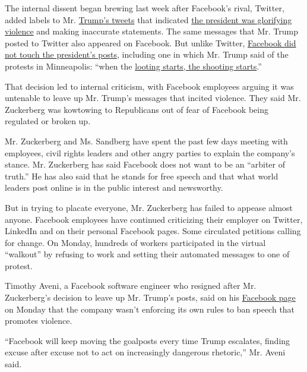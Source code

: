 The internal dissent began brewing last week after Facebook's rival,
Twitter, added labels to Mr.
\href{https://www.nytimes3xbfgragh.onion/2020/06/03/us/politics/trump-twitter-fact-check.html}{Trump's
tweets} that indicated
\href{https://www.nytimes3xbfgragh.onion/2020/05/29/technology/trump-twitter-minneapolis-george-floyd.html}{the
president was glorifying violence} and making inaccurate statements. The
same messages that Mr. Trump posted to Twitter also appeared on
Facebook. But unlike Twitter,
\href{https://www.nytimes3xbfgragh.onion/2020/05/29/technology/twitter-facebook-zuckerberg-trump.html}{Facebook
did not touch the president's posts}, including one in which Mr. Trump
said of the protests in Minneapolis: ``when the
\href{https://www.nytimes3xbfgragh.onion/2020/05/29/us/looting-starts-shooting-starts.html}{looting
starts, the shooting starts}.''

That decision led to internal criticism, with Facebook employees arguing
it was untenable to leave up Mr. Trump's messages that incited violence.
They said Mr. Zuckerberg was kowtowing to Republicans out of fear of
Facebook being regulated or broken up.

Mr. Zuckerberg and Ms. Sandberg have spent the past few days meeting
with employees, civil rights leaders and other angry parties to explain
the company's stance. Mr. Zuckerberg has said Facebook does not want to
be an ``arbiter of truth.'' He has also said that he stands for free
speech and that what world leaders post online is in the public interest
and newsworthy.

But in trying to placate everyone, Mr. Zuckerberg has failed to appease
almost anyone. Facebook employees have continued criticizing their
employer on Twitter, LinkedIn and on their personal Facebook pages. Some
circulated petitions calling for change. On Monday, hundreds of workers
participated in the virtual ``walkout'' by refusing to work and setting
their automated messages to one of protest.

Timothy Aveni, a Facebook software engineer who resigned after Mr.
Zuckerberg's decision to leave up Mr. Trump's posts, said on his
\href{https://www.facebookcorewwwi.onion/timothy.j.aveni/posts/3006224359465567}{Facebook
page} on Monday that the company wasn't enforcing its own rules to ban
speech that promotes violence.

``Facebook will keep moving the goalposts every time Trump escalates,
finding excuse after excuse not to act on increasingly dangerous
rhetoric,'' Mr. Aveni said.

